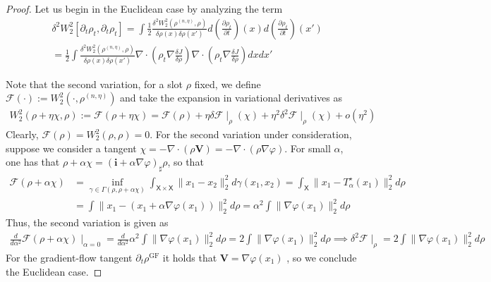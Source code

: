 \documentclass[reqno,11pt,letterpaper]{amsart}
\theoremstyle{plain}
\theoremstyle{definition}
\theoremstyle{remark}
\newcommand{\wass}{\mathrm{GF}}
\begin{document}
\begin{proof}
Let us begin in the Euclidean case by analyzing the term
\begin{align*}
& \delta^{2}W_{2}^{2}[\partial_{t} \rho_{t}, \partial_{t} \rho_{t}] = \int \frac{1}{2} \frac{\delta^{2} W_{2}^{2}(\rho^{(n, \eta)}, \rho)}{ \delta \rho(x) \delta \rho(x')} d\left(\frac{\partial \rho_{t}}{\partial t}\right)(x)d\left(\frac{\partial \rho_{t}}{\partial t}\right)(x') \\
&= \frac{1}{2}\int \frac{\delta^{2} W_{2}^{2}(\rho^{(n, \eta)}, \rho)}{ \delta \rho(x) \delta \rho(x')} \nabla \cdot \left(\rho_{t} \nabla \frac{\delta J}{\delta \rho} \right) \nabla \cdot \left(\rho_{t} \nabla \frac{\delta J}{\delta \rho}\right) dx dx'
\end{align*}

Note that the second variation, for a slot $\rho$ fixed, we define $\mathcal{F}(\cdot) := W_{2}^{2}(\cdot, \rho^{(n,\eta)} )$ and take the expansion in variational derivatives as
\begin{align*}
    W_{2}^{2}(\rho + \eta \chi, \rho ) := \mathcal{F}(\rho + \eta \chi) = \mathcal{F}(\rho) + \eta \delta \mathcal{F} \mid_{\rho} (\chi) + \eta^{2} \delta^{2} \mathcal{F} \mid_{\rho}(\chi) + o(\eta^{2})
\end{align*}
Clearly, $\mathcal{F}(\rho) = W_{2}^{2}(\rho, \rho ) = 0$. For the second variation under consideration, suppose we consider a tangent $\chi = - \nabla \cdot (\rho \mathbf{V}) = - \nabla \cdot (\rho \nabla \varphi)$. For small $\alpha$, one has that $\rho + \alpha \chi = (\mathbf{i} + \alpha \nabla \varphi)_{\sharp} \rho$, so that
\begin{align*}
    \mathcal{F} (\rho + \alpha \chi) &= \inf_{\gamma \in \Gamma(\rho, \rho + \alpha \chi)} \int_{\mathsf{X} \times \mathsf{X}} \lVert x_{1} - x_{2} \rVert_{2}^{2} d\gamma(x_{1}, x_{2}) = \int_\mathsf{X} \lVert x_{1} - T^{\star}_{\alpha}(x_{1}) \rVert_{2}^{2} d \rho \\
    & = \int \lVert x_{1} - \left( x_{1} + \alpha \nabla \varphi(x_{1}) \right) \rVert_{2}^{2} d \rho = \alpha^{2} \int \lVert \nabla \varphi(x_{1}) \rVert_{2}^{2} d \rho
\end{align*}
Thus, the second variation is given as
\begin{align*}
    \frac{d}{d\alpha^{2}} \mathcal{F}(\rho + \alpha \chi) \mid_{\alpha = 0} = \frac{d}{d\alpha^{2}}\alpha^{2} \int \lVert \nabla \varphi(x_{1}) \rVert_{2}^{2} d \rho = 2\int \lVert \nabla \varphi(x_{1}) \rVert_{2}^{2} d \rho \implies \delta^{2} \mathcal{F} \mid_{\rho} = 2\int \lVert \nabla \varphi(x_{1}) \rVert_{2}^{2} d \rho
\end{align*}
For the gradient-flow tangent $\partial_{t}  \rho^{\wass}$ it holds that $\mathbf{V} = \nabla \varphi(x_{1})$ \cite{AGS2008}, so we conclude the Euclidean case.


\end{proof}
\end{document}
